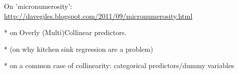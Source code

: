 \documentclass[10pt]{article}
\def\themonth{\ifcase\month\or
  January\or February\or March\or April\or May\or June\or
  July\or August\or September\or October\or November\or December\fi}
\begin{document}
\citealp[Chap 3.6 and Chap 6.4--6.6]{james2013introduction}


On 'micronumerosity': \url{http://davegiles.blogspot.com/2011/09/micronumerosity.html}

*\citealp[Chap 13]{fox2008applied} on Overly (Multi)Collinear predictors.

*\citealp{ache:02} (on why kitchen sink regression are a problem)

*\citealp[Chap 7]{fox2008applied} on a common case of collinearity:
categorical predictors/dummy variables










\end{document}
